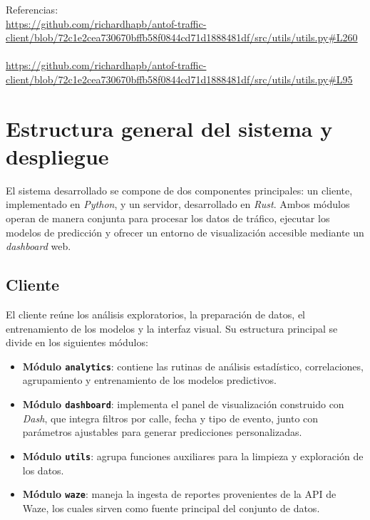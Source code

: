 \documentclass[12pt]{article}
\begin{document}
Referencias: \\
\url{https://github.com/richardhapb/antof-traffic-client/blob/72c1e2cea730670bffb58f0844cd71d1888481df/src/utils/utils.py#L260} \\\\
\url{https://github.com/richardhapb/antof-traffic-client/blob/72c1e2cea730670bffb58f0844cd71d1888481df/src/utils/utils.py#L95}

\newpage

\section{Estructura general del sistema y despliegue}
\label{annex:dashboard}

El sistema desarrollado se compone de dos componentes principales: un cliente, implementado en \textit{Python}, y un servidor, desarrollado en \textit{Rust}.
Ambos módulos operan de manera conjunta para procesar los datos de tráfico, ejecutar los modelos de predicción y ofrecer un entorno de visualización accesible mediante un \textit{dashboard} web.

\subsection*{Cliente}

El cliente reúne los análisis exploratorios, la preparación de datos, el entrenamiento de los modelos y la interfaz visual.
Su estructura principal se divide en los siguientes módulos:

\begin{itemize}
    \item \textbf{Módulo \texttt{analytics}}: contiene las rutinas de análisis estadístico, correlaciones, agrupamiento y entrenamiento de los modelos predictivos.
    \item \textbf{Módulo \texttt{dashboard}}: implementa el panel de visualización construido con \textit{Dash}, que integra filtros por calle, fecha y tipo de evento, junto con parámetros ajustables para generar predicciones personalizadas.
    \item \textbf{Módulo \texttt{utils}}: agrupa funciones auxiliares para la limpieza y exploración de los datos.
    \item \textbf{Módulo \texttt{waze}}: maneja la ingesta de reportes provenientes de la API de Waze, los cuales sirven como fuente principal del conjunto de datos.
\end{itemize}
\end{document}
